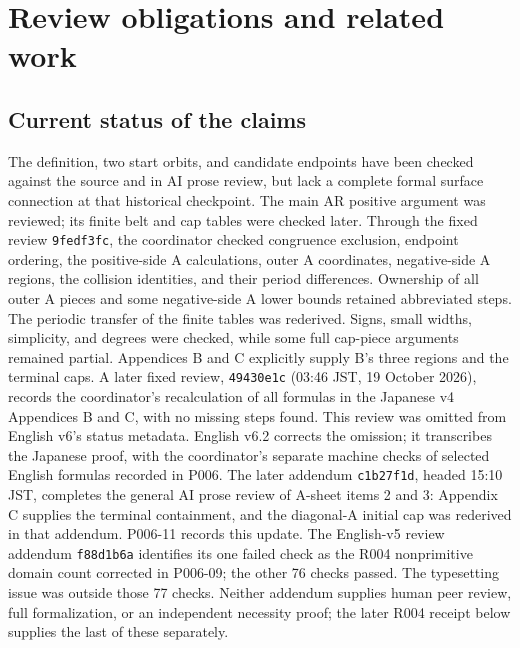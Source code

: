 \documentclass[11pt]{amsart}
\newcommand{\record}[1]{\nolinkurl{#1}}
\begin{document}
\section{Review obligations and related work}\label{sec:review}
\subsection{Current status of the claims}
The definition, two start orbits, and candidate endpoints have been
checked against the source and in AI prose review, but lack a complete
formal surface connection at that historical checkpoint. The main AR positive argument was reviewed;
its finite belt and cap tables were checked later. Through the fixed
review \record{9fedf3fc}, the coordinator checked congruence exclusion,
endpoint ordering, the positive-side A calculations, outer A coordinates,
negative-side A regions, the collision identities, and their period
differences. Ownership of all outer A pieces and some negative-side A
lower bounds retained abbreviated steps. The periodic transfer of the
finite tables was rederived. Signs, small widths, simplicity, and degrees
were checked, while some full cap-piece arguments remained partial.
Appendices B and C explicitly supply B's three regions and the terminal
caps. A later fixed review, \record{49430e1c} (03:46 JST, 19 October
2026), records the coordinator's recalculation of all formulas in the
Japanese v4 Appendices B and C, with no missing steps found. This review
was omitted from English v6's status metadata. English v6.2 corrects the
omission; it transcribes the Japanese proof, with the coordinator's
separate machine checks of selected English formulas recorded in P006.
The later addendum \record{c1b27f1d}, headed 15:10 JST, completes
the general AI prose review of A-sheet items 2 and 3: Appendix C
supplies the terminal containment, and the diagonal-A initial cap
was rederived in that addendum. P006-11 records this update.
The English-v5 review addendum \record{f88d1b6a} identifies its one
failed check as the R004 nonprimitive domain count corrected in
P006-09; the other 76 checks passed. The typesetting issue was
outside those 77 checks. Neither addendum supplies human peer
review, full formalization, or an independent necessity proof; the later
R004 receipt below supplies the last of these separately.
\end{document}
